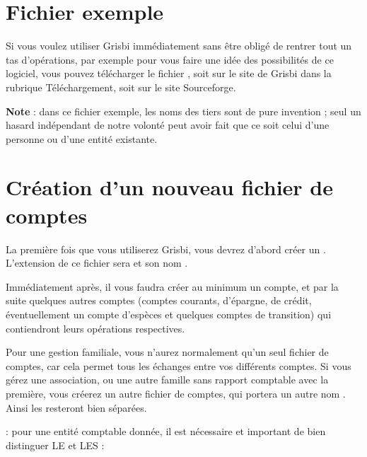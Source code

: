 \section{Fichier exemple\label{start-example}}


Si vous voulez utiliser Grisbi immédiatement sans être obligé de rentrer tout un tas d'opérations, par exemple  pour vous faire une idée des possibilités de ce logiciel, vous pouvez télécharger le fichier , soit sur le site de Grisbi dans la rubrique Téléchargement{\siteGrisbiTelechargement}, soit sur le site {Sourceforge}{\siteSourceForgeDocumentation}.

\textbf{Note} : dans ce fichier exemple, les noms des tiers sont de pure invention ; seul un hasard indépendant de notre volonté peut avoir fait que ce soit celui d'une personne ou d'une entité existante.


\section{Création d'un nouveau fichier de comptes\label{start-newfile}}


La première fois que vous utiliserez Grisbi, vous devrez d'abord créer un . L'\gls{extension} de ce fichier sera  et son nom . 

Immédiatement après, il vous faudra créer au minimum un compte, et par la suite quelques autres comptes (comptes courants, d'épargne, de crédit, éventuellement un compte d'espèces et quelques comptes de transition) qui contiendront leurs opérations respectives. 

Pour une gestion familiale, vous n'aurez normalement qu'un seul fichier de comptes, car cela permet tous les échanges entre vos différents comptes. Si vous gérez une association, ou une autre famille sans rapport comptable avec la première, vous créerez un autre fichier de comptes, qui portera un autre nom . Ainsi les  resteront bien séparées.

 : pour une entité comptable donnée, il est nécessaire et important de bien distinguer LE \og {} \fg{} et LES \og {} \fg{} :

